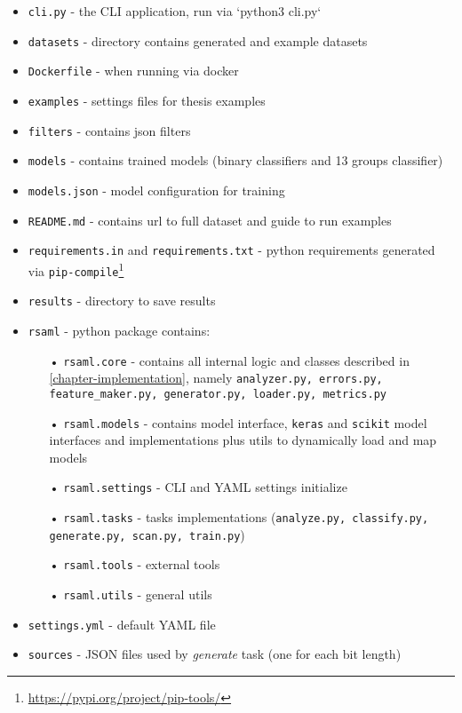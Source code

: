 \begin{itemize}

\item \texttt{cli.py} - the CLI application, run via `python3 cli.py`
\item \texttt{datasets} - directory contains generated and example datasets
\item \texttt{Dockerfile} - when running via docker
\item \texttt{examples} - settings files for thesis examples
\item \texttt{filters} - contains json filters
\item \texttt{models} - contains trained models (binary classifiers and 13 groups classifier)
\item \texttt{models.json} - model configuration for training
\item \texttt{README.md} - contains url to full dataset and guide to run examples
\item \texttt{requirements.in} and \texttt{requirements.txt} - python requirements generated via \texttt{pip-compile}\footnote{\url{https://pypi.org/project/pip-tools/}}
\item \texttt{results} - directory to save results
\item \texttt{rsaml} - python package contains:
\begin{itemize}
\item[•] \texttt{rsaml.core} - contains all internal logic and classes described in \autoref{chapter-implementation}, namely \texttt{analyzer.py, errors.py, feature\_maker.py, generator.py, loader.py, metrics.py}
\item[•] \texttt{rsaml.models} - contains model interface, \texttt{keras} and \texttt{scikit} model interfaces and implementations plus utils to dynamically load and map models
\item[•] \texttt{rsaml.settings} - CLI and YAML settings initialize
\item[•] \texttt{rsaml.tasks} - tasks implementations (\texttt{analyze.py, classify.py, generate.py, scan.py, train.py})
\item[•] \texttt{rsaml.tools} - external tools
\item[•] \texttt{rsaml.utils} - general utils
\end{itemize}
\item \texttt{settings.yml} - default YAML file
\item \texttt{sources} - JSON files used by \textit{generate} task (one for each bit length)

\end{itemize}


